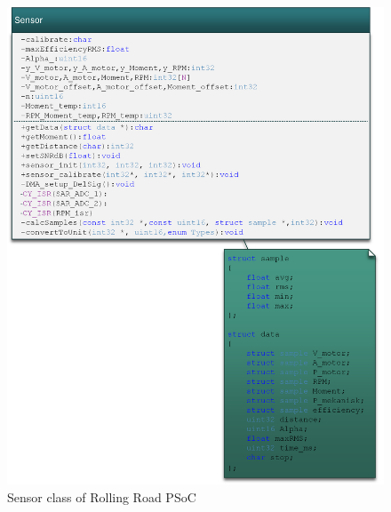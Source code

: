 \begin{figure}[H]
	\centering
	\includegraphics [width=5in]{Software/Pictures/klassediagram_sensor.png}
	\caption{Sensor class of Rolling Road PSoC}
	\label{fig:Class_diagram_Sensor_RR_PSoC}
\end{figure}


